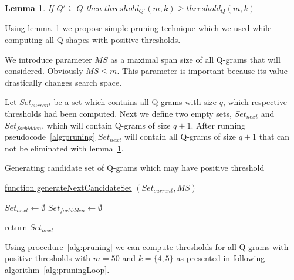 \documentclass[paper=a4, fontsize=11pt]{scrartcl} %
\newtheorem{lemma}[theorem]{Lemma}
\numberwithin{equation}{section} %
\numberwithin{figure}{section} %
\numberwithin{table}{section} %
\begin{document}
\begin{lemma}
    \label{subSetLemma}
    If $Q' \subseteq Q$ then $threshold_{Q'}(m,k) \geq threshold_{Q}(m,k)$
\end{lemma}

Using lemma~\ref{subSetLemma} we propose simple pruning technique which we used
while computing all Q-shapes with positive thresholds.

We introduce parameter $MS$ as a maximal span size of all Q-grams that will
considered. Obviously $MS \leq m$. This parameter is important because its value
drastically changes search space.

Let $Set_{current}$ be a set which contains all Q-grams with size $q$, which
respective thresholds had been computed.
Next we define two empty sets, $Set_{next}$ and $Set_{forbidden}$, which will
contain Q-grams of size $q+1$. After running pseudocode~\ref{alg:pruning}
$Set_{next}$ will contain all Q-grams of size $q+1$ that can not be eliminated
with lemma~\ref{subSetLemma}. 

\begin{algorithm}[H]
\caption{Generating candidate set of Q-grams which may have positive threshold}
\label{alg:pruning}
\underline{function generateNextCancidateSet} $(Set_{current}, MS)$\;


\begin{algorithmic}
	 \STATE $Set_{next} \gets \emptyset$
	 \STATE $Set_{forbidden} \gets \emptyset$
     
         \ENDFOR
     \ENDFOR
\end{algorithmic}
return $Set_{next}$
\end{algorithm}

Using procedure~\ref{alg:pruning} we can compute thresholds for all Q-grams with
positive thresholds with $m=50$ and $k=\{4,5\}$ as presented in following
algorithm~\ref{alg:pruningLoop}.
\end{document}
